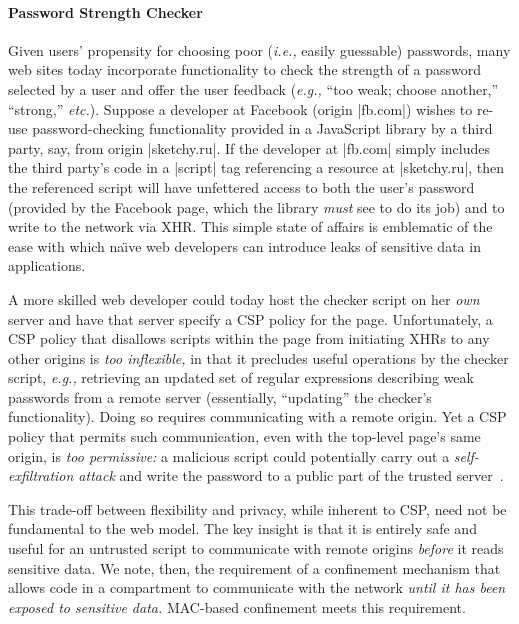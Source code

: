 \paragraph{Password Strength Checker} Given users' propensity for choosing poor
(\emph{i.e.,} easily guessable) passwords, many web sites today incorporate
functionality to check the strength of a password selected by a user
and offer the user feedback (\emph{e.g.,} ``too weak; choose another,''
``strong,'' \emph{etc.}). Suppose a developer at Facebook (origin
\js|fb.com|) wishes to re-use password-checking functionality provided
in a JavaScript library by a third party, say, from origin
\js|sketchy.ru|. If the developer at \js|fb.com| simply includes the
third party's code in a \js|script| tag referencing a resource at
\js|sketchy.ru|, then the referenced script will have unfettered
access to both the user's password (provided by the Facebook page,
which the library {\em must} see to do its job) and to write to the
network via XHR\@. This simple state of affairs is emblematic of the
ease with which na\"{\i}ve web developers can introduce leaks of
sensitive data in applications.

A more skilled web developer could today host the checker script on
her {\em own} server and have that server specify a CSP policy for the
page.
%
Unfortunately, a CSP policy that disallows scripts within the page
from initiating XHRs to any other origins is \emph{too inflexible,} in
that it precludes useful operations by the checker script, \emph{e.g.,}
retrieving an updated set of regular expressions describing weak
passwords from a remote server (essentially, ``updating'' the
checker's functionality). Doing so requires communicating with a
remote origin.
%
Yet a CSP policy that permits such communication, even with the
top-level page's same origin, is \emph{too permissive:} a malicious
script could potentially carry out a \emph{self-exfiltration attack}
and write the password to a public part of the trusted
server~\cite{Yip:2009:PBS, selfex}.

This trade-off between flexibility and privacy, while inherent to
CSP, need not be fundamental to the web model.
%
The key insight is that it is entirely safe and useful for an untrusted script to
communicate with remote origins {\em before} it reads sensitive
data. We note, then, the requirement of a confinement mechanism that
allows code in a compartment to communicate with the network {\em
  until it has been exposed to sensitive data.} MAC-based confinement
meets this requirement.

